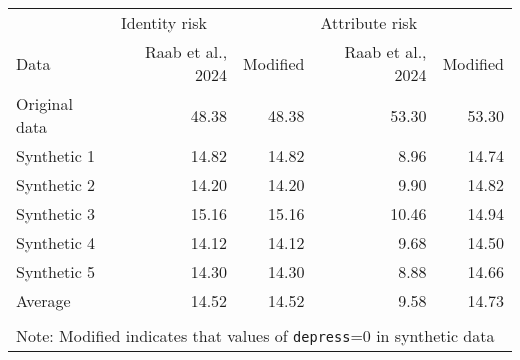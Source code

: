 \begin{tabular}{lrrrr}
   
\toprule & 
\multicolumn{2}{l}{Identity risk} &
\multicolumn{2}{l}{Attribute risk}
\\  
 
\cmidrule(lr){2-3}
\cmidrule(lr){4-5}
 
Data & Raab et al., 2024 & Modified & Raab et al., 2024 & Modified
\\ 

\midrule
Original data & 48.38 & 48.38 & 53.30 & 53.30 \\ 
  Synthetic 1 & 14.82 & 14.82 & 8.96 & 14.74 \\ 
  Synthetic 2 & 14.20 & 14.20 & 9.90 & 14.82 \\ 
  Synthetic 3 & 15.16 & 15.16 & 10.46 & 14.94 \\ 
  Synthetic 4 & 14.12 & 14.12 & 9.68 & 14.50 \\ 
  Synthetic 5 & 14.30 & 14.30 & 8.88 & 14.66 \\ 
  Average & 14.52 & 14.52 & 9.58 & 14.73 \\ 
   \bottomrule \\[-1.8ex] \multicolumn{5}{p{4in}}{Note: Modified indicates that values of \texttt{depress}=0  in synthetic data} 
\end{tabular}
